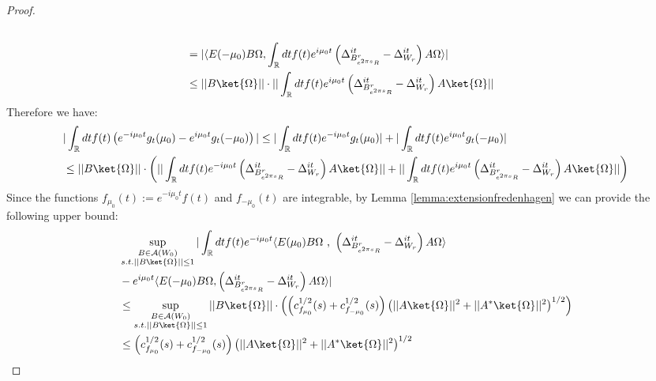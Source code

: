 \documentclass[a4paper,11pt]{article}
\theoremstyle{definition}
\newcommand{\lb}{\left(}
\newcommand{\rb}{\right)}
\begin{document}
\begin{proof}
\begin{align}
\begin{split}
            \\&
            = |\langle E(-\mu_0)B\Omega, \int_\mathbb{R} dt f(t) e^{i\mu_0 t}\lb\Delta^{it}_{B^r_{e^{2\pi s}R}} - \Delta^{it}_{W_r}\rb A \Omega \rangle|
            \\&
            \leq ||B\ket{\Omega}||\cdot||\int_\mathbb{R} dt f(t) e^{i\mu_0 t}\lb \Delta^{it}_{B^r_{e^{2\pi s}R}} - \Delta^{it}_{W_r} \rb A\ket{\Omega}||
        \end{split}
    \end{align}
    Therefore we have:
    \begin{align}
        \begin{split}
            &|\int_\mathbb{R} dt f(t)\lb e^{-i\mu_0 t}g_t(\mu_0) - e^{i\mu_0 t}g_t(-\mu_0) \rb| \leq |\int_\mathbb{R} dt f(t) e^{-i\mu_0 t}g_t(\mu_0)| + |\int_\mathbb{R} dt f(t) e^{i\mu_0 t}g_t(-\mu_0)|
            \\&
            \leq ||B\ket{\Omega}||\cdot \lb||\int_\mathbb{R} dt f(t) e^{-i\mu_0 t}\lb\Delta^{it}_{B^r_{e^{2\pi s}R}} - \Delta^{it}_{W_r}\rb A\ket{\Omega}|| + ||\int_\mathbb{R} dt f(t) e^{i\mu_0 t}\lb\Delta^{it}_{B^r_{e^{2\pi s}R}} - \Delta^{it}_{W_r}\rb A\ket{\Omega}||\rb
        \end{split}
    \end{align}
    Since the functions $f_{\mu_0}(t) := e^{-i\mu_0 t}f(t)$ and $f_{-\mu_0}(t)$ are integrable, by Lemma \ref{lemma:extensionfredenhagen} we can provide the following upper bound:
    \begin{align}
        \begin{split}
            &\sup_{\substack{B\in\mathcal{A}(W_0)\\s.t.||B\ket{\Omega}||\leq 1}}|\int_\mathbb{R} dt f(t) e^{-i\mu_0 t}\langle E(\mu_0)B\Omega\text{ , }\lb\Delta^{it}_{B^r_{e^{2\pi s}R}} - \Delta^{it}_{W_r}\rb A\Omega\rangle \\& - e^{i\mu_0 t}\langle E(-\mu_0)B\Omega, \lb\Delta^{it}_{B^r_{e^{2\pi s}R}} - \Delta^{it}_{W_r}\rb A\Omega\rangle|
            \\&
            \leq \sup_{\substack{B\in\mathcal{A}(W_0)\\s.t.||B\ket{\Omega}||\leq 1}}||B\ket{\Omega}||\cdot\lb \lb c_{f_{\mu_0}}^{1/2}(s) + c_{f_{-\mu_0}}^{1/2}(s)\rb\lb||A\ket{\Omega}||^2 + ||A^*\ket{\Omega}||^2\rb^{1/2}\rb
            \\&
            \leq \lb c_{f_{\mu_0}}^{1/2}(s) + c_{f_{-\mu_0}}^{1/2}(s)\rb\lb||A\ket{\Omega}||^2 + ||A^*\ket{\Omega}||^2\rb^{1/2}
        \end{split}

\end{align}
\end{proof}
\end{document}
